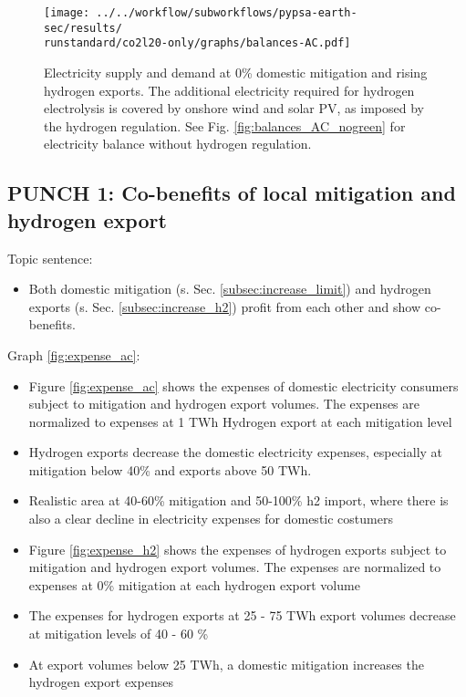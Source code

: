 

\begin{figure}[h!]
    \centering
    \texttt{[image: ../../workflow/subworkflows/pypsa-earth-sec/results/\\runstandard/co2l20-only/graphs/balances-AC.pdf]}
    \caption{Electricity supply and demand at 0\% 
    domestic mitigation and rising hydrogen exports. The additional electricity required for hydrogen electrolysis is covered by onshore wind and solar PV, as imposed by the hydrogen regulation. See Fig. \ref{fig:balances_AC_nogreen} for electricity balance without hydrogen regulation.}
    \label{fig:balances-ac-co2l20}
\end{figure}


\newpage
\thispagestyle{empty}
\newpage

\subsection{PUNCH 1: Co-benefits of local mitigation and hydrogen export}
\label{subsec:benefits}

Topic sentence:
\begin{itemize}
    \item Both domestic mitigation (s. Sec. \ref{subsec:increase_limit}) and hydrogen exports (s. Sec. \ref{subsec:increase_h2}) profit from each other and show co-benefits.
\end{itemize}


Graph \ref{fig:expense_ac}:
\begin{itemize}
    \item Figure \ref{fig:expense_ac} shows the expenses of domestic electricity consumers subject to mitigation and hydrogen export volumes. The expenses are normalized to expenses at 1 TWh Hydrogen export at each mitigation level
    \item Hydrogen exports decrease the domestic electricity expenses, especially at mitigation below 40\% and exports above 50 TWh.
    \item Realistic area at 40-60\% mitigation and 50-100\% h2 import, where there is also a clear decline in electricity expenses for domestic costumers
    \item Figure \ref{fig:expense_h2} shows the expenses of hydrogen exports subject to mitigation and hydrogen export volumes. The expenses are normalized to expenses at 0\% mitigation at each hydrogen export volume
    \item The expenses for hydrogen exports at 25 - 75 TWh export volumes decrease at mitigation levels of 40 - 60 \% 
    \item At export volumes below 25 TWh, a domestic mitigation increases the hydrogen export expenses
\end{itemize}

